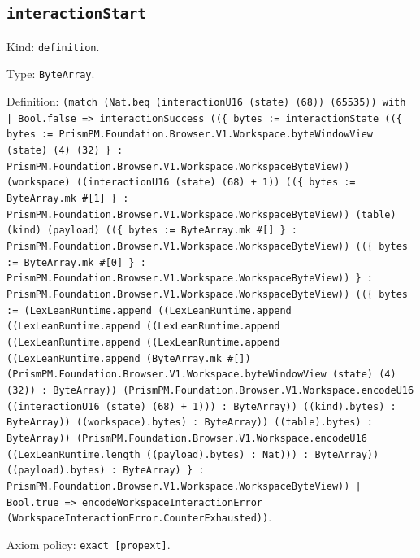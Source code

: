 \documentclass[11pt]{article}
\begin{document}
\subsection*{\texttt{interactionStart}}
\noindent Kind: \texttt{definition}.\par
\noindent Type: \texttt{ByteArray}.\par
\noindent Definition: \texttt{(match (Nat.beq (interactionU16 (state) (68)) (65535)) with | Bool.false => interactionSuccess ((\{ bytes := interactionState ((\{ bytes := PrismPM.Foundation.Browser.V1.Workspace.byteWindowView (state) (4) (32) \} : PrismPM.Foundation.Browser.V1.Workspace.WorkspaceByteView)) (workspace) ((interactionU16 (state) (68) + 1)) ((\{ bytes := ByteArray.mk \#[1] \} : PrismPM.Foundation.Browser.V1.Workspace.WorkspaceByteView)) (table) (kind) (payload) ((\{ bytes := ByteArray.mk \#[] \} : PrismPM.Foundation.Browser.V1.Workspace.WorkspaceByteView)) ((\{ bytes := ByteArray.mk \#[0] \} : PrismPM.Foundation.Browser.V1.Workspace.WorkspaceByteView)) \} : PrismPM.Foundation.Browser.V1.Workspace.WorkspaceByteView)) ((\{ bytes := (LexLeanRuntime.append ((LexLeanRuntime.append ((LexLeanRuntime.append ((LexLeanRuntime.append ((LexLeanRuntime.append ((LexLeanRuntime.append ((LexLeanRuntime.append (ByteArray.mk \#[]) (PrismPM.Foundation.Browser.V1.Workspace.byteWindowView (state) (4) (32)) : ByteArray)) (PrismPM.Foundation.Browser.V1.Workspace.encodeU16 ((interactionU16 (state) (68) + 1))) : ByteArray)) ((kind).bytes) : ByteArray)) ((workspace).bytes) : ByteArray)) ((table).bytes) : ByteArray)) (PrismPM.Foundation.Browser.V1.Workspace.encodeU16 ((LexLeanRuntime.length ((payload).bytes) : Nat))) : ByteArray)) ((payload).bytes) : ByteArray) \} : PrismPM.Foundation.Browser.V1.Workspace.WorkspaceByteView)) | Bool.true => encodeWorkspaceInteractionError (WorkspaceInteractionError.CounterExhausted))}.\par
\noindent Axiom policy: \texttt{exact [propext]}.\par
\end{document}
